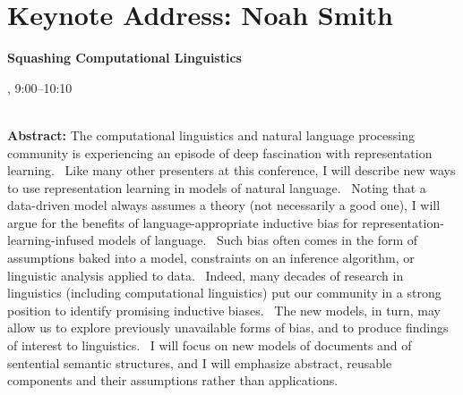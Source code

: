 \section{Keynote Address: Noah Smith}

\begin{center}
\begin{Large}
{\bfseries\Large Squashing Computational Linguistics}\vspace{1em}\par
\end{Large}

\daydateyear, 9:00--10:10 \vspace{1em}\\
\PlenaryLoc \\
\vspace{1em}\par
\end{center}

\noindent
{\bfseries Abstract:} The computational linguistics and natural language processing community is experiencing an episode of deep fascination with representation learning.  Like many other presenters at this conference, I will describe new ways to use representation learning in models of natural language.  Noting that a data-driven model always assumes a theory (not necessarily a good one), I will argue for the benefits of language-appropriate inductive bias for representation-learning-infused models of language.  Such bias often comes in the form of assumptions baked into a model, constraints on an inference algorithm, or linguistic analysis applied to data.  Indeed, many decades of research in linguistics (including computational linguistics) put our community in a strong position to identify promising inductive biases.  The new models, in turn, may allow us to explore previously unavailable forms of bias, and to produce findings of interest to linguistics.  I will focus on new models of documents and of sentential semantic structures, and I will emphasize abstract, reusable components and their assumptions rather than applications.

\vspace{3em}\par 

\vfill
\noindent

